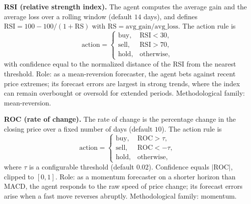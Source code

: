 \documentclass{ieeeaccess}
\begin{document}
\textbf{RSI (relative strength index).} The agent computes the average gain and the average loss over a rolling window (default $14$ days), and defines $\mathrm{RSI} = 100 - 100/(1 + \mathrm{RS})$ with $\mathrm{RS} = \mathrm{avg\_gain}/\mathrm{avg\_loss}$. The action rule is
\begin{equation}
\mathrm{action} =
\begin{cases}
\mathrm{buy}, & \mathrm{RSI} < 30, \\
\mathrm{sell}, & \mathrm{RSI} > 70, \\
\mathrm{hold}, & \mathrm{otherwise},
\end{cases}
\end{equation}
with confidence equal to the normalized distance of the RSI from the nearest threshold. Role: as a mean-reversion forecaster, the agent bets against recent price extremes; its forecast errors are largest in strong trends, where the index can remain overbought or oversold for extended periods. Methodological family: mean-reversion.

\textbf{ROC (rate of change).} The rate of change is the percentage change in the closing price over a fixed number of days (default $10$). The action rule is
\begin{equation}
\mathrm{action} =
\begin{cases}
\mathrm{buy}, & \mathrm{ROC} > \tau, \\
\mathrm{sell}, & \mathrm{ROC} < -\tau, \\
\mathrm{hold}, & \mathrm{otherwise},
\end{cases}
\end{equation}
where $\tau$ is a configurable threshold (default $0.02$). Confidence equals $|\mathrm{ROC}|$, clipped to $[0, 1]$. Role: as a momentum forecaster on a shorter horizon than MACD, the agent responds to the raw speed of price change; its forecast errors arise when a fast move reverses abruptly. Methodological family: momentum.
\end{document}
